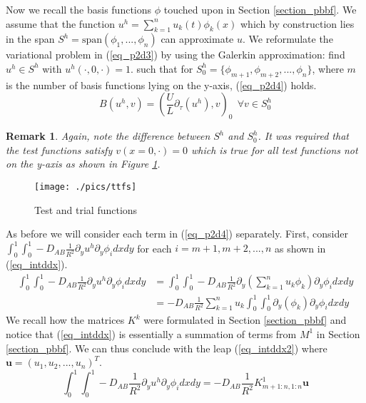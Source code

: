 \documentclass[11pt,fleqn]{article}
\theoremstyle{defstyle}
\newtheorem{rmrk}{Remark}[section]
\begin{document}
Now we recall the basis functions $\phi$ touched upon in Section \ref{section_pbbf}. We assume that the function $u^h =\sum^n_{k=1} u_k(t) \phi_k(x)$ which by construction lies in the span $S^h=\text{span}(\phi_1,...,\phi_n)$ can approximate $u$. We reformulate the variational problem in (\ref{eq_p2d3}) by using the Galerkin approximation: find $u^h \in S^h$ with $u^h(\cdot, 0,\cdot) = 1.$ such that for $S^h_0=\{\phi_{m+1}, \phi_{m+2},...,\phi_n \}$, where $m$ is the number of basis functions lying on the y-axis, (\ref{eq_p2d4}) holds.
\begin{equation}
B(u^h,v) = (\frac{U}{L} \partial_\tau (u^h), v)_0~~ \forall v \in S^h_0
\label{eq_p2d4}
\end{equation}
\begin{rmrk}
Again, note the difference between $S^h$ and $S^h_0$. It was required that the test functions satisfy $v(x=0,\cdot)=0$ which is true for all test functions not on the y-axis as shown in Figure \ref{fig_ttfs}. 
\end{rmrk}
\begin{figure}[H] 
\centering
\texttt{[image: ./pics/ttfs]}
\caption{Test and trial functions} 
\label{fig_ttfs}
\end{figure}
As before we will consider each term in (\ref{eq_p2d4}) separately. First, consider $ \int_0^1 \int_0^1 -D_{AB}\frac{1}{R^2}\partial_y u^h \partial_y \phi_i dxdy$ for each $i=m+1, m+2,...,n$ as shown in (\ref{eq_intddx}).
\begin{equation}
\begin{aligned}
\int_0^1 \int_0^1 -D_{AB}\frac{1}{R^2}\partial_y u^h \partial_y \phi_i dxdy &= \int_0^1 \int_0^1 -D_{AB}\frac{1}{R^2}\partial_y \left(\sum^n_{k=1} u_k \phi_k\right) \partial_y \phi_i dxdy \\
&= -D_{AB}\frac{1}{R^2}\sum^n_{k=1} u_k\int_0^1 \int_0^1 \partial_y (\phi_k) \partial_y \phi_i dxdy  
\end{aligned}
\label{eq_intddx}
\end{equation}
We recall how the matrices $K^k$ were formulated in Section \ref{section_pbbf} and notice that (\ref{eq_intddx}) is essentially a summation of terms from $M^1$ in Section \ref{section_pbbf}. We can thus conclude with the leap (\ref{eq_intddx2}) where $\mathbf{u} = \left(u_1,u_2,...,u_n\right)^T$.
\begin{equation}
\int_0^1 \int_0^1 -D_{AB}\frac{1}{R^2}\partial_y u^h \partial_y \phi_i dxdy = -D_{AB}\frac{1}{R^2}K^1_{m+1:n, 1:n}\mathbf{u}
\label{eq_intddx2}
\end{equation}
\end{document}
